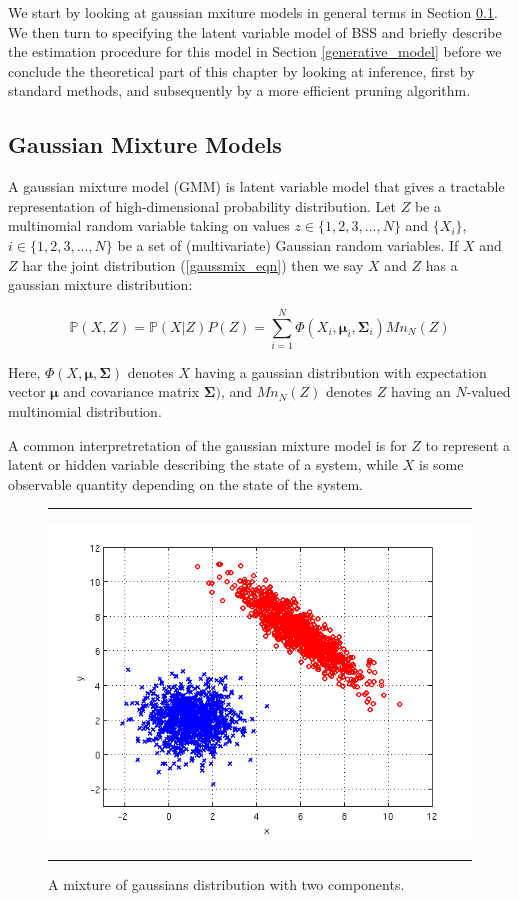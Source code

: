 \documentclass[11pt, oneside, a4paper]{report}
\begin{document}
We start by looking at gaussian mxiture models in general terms in Section \ref{gmm_general}. 
We then turn to specifying the latent variable model of BSS and briefly describe the estimation 
procedure for this model in Section \ref{generative_model} before we conclude the theoretical
part of this chapter by looking at inference, first by standard methods, and subsequently by a more 
efficient pruning algorithm.

\subsection{Gaussian Mixture Models}\label{gmm_general}
A gaussian mixture model (GMM) is latent variable model that gives a
tractable representation of high-dimensional probability
distribution. Let $Z$ be a multinomial random variable taking on
values $z \in \{1,2,3,...,N\}$ and $\{X_i\}$, $i \in \{1,2,3,...,N\}$
be a set of (multivariate) Gaussian random variables. If $X$ and $Z$
har the joint distribution (\ref{gaussmix_eqn}) then we say $X$ and $Z$
has a gaussian mixture distribution:

\begin{equation}\label{gaussmix_eqn}
  \mathbb{P}(X,Z) = \mathbb{P}(X|Z)P(Z) = \sum_{i = 1}^N
  \Phi(X_i,\mathbf{\mu}_i, \mathbf{\Sigma}_i)Mn_N(Z)
\end{equation}
 
Here, $\Phi(X,\mathbf{\mu}, \mathbf{\Sigma})$ denotes $X$ having a
gaussian distribution with expectation vector $\mathbf{\mu}$ and
covariance matrix $\mathbf{\Sigma})$, and $Mn_N(Z)$ denotes $Z$ having
an $N$-valued multinomial distribution.


A common interpretretation of the gaussian mixture model is for $Z$ to
represent a latent or hidden variable describing the state of a
system, while $X$ is some observable quantity depending on the state
of the system. 

 
\begin{figure}
  \centering
  \hrule
  \includegraphics[width = .8\textwidth]{Figures/gaussmix}
  \hrule
  \caption{A mixture of gaussians distribution with two components.}
  \label{gmm_fig}
\end{figure}
\end{document}
